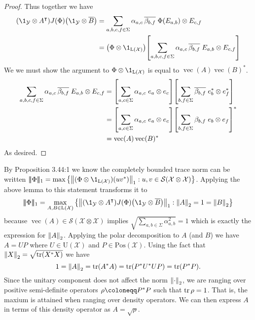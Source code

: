 \documentclass[boxes,pages,color=SeaGreen]{homework}
\renewcommand{\vec}{\operatorname{vec}}
\newcommand{\X}{\mathcal{X}}
\newcommand{\Y}{\mathcal{Y}}
\newcommand{\Lin}{\mathrm{L}}
\newcommand{\Pos}{\mathrm{Pos}}
\newcommand{\Unitary}{\mathrm{U}}
\newcommand{\triplenorm}[1]{
  \lvert\!\lvert\!\lvert #1 
  \rvert\!\rvert\!\rvert}
\begin{document}
\begin{solution}
\begin{proof}
        Thus together we have
        \begin{align*}
            \qty(\1_\Y\otimes A^\intercal)J(\Phi)\qty(\1_\Y\otimes\overline{B}) & = \sum_{a,b,c,f\in\Sigma}\alpha_{a,c}\,\overline{\beta_{b,f}}\;\Phi(E_{a,b})\otimes E_{c,f}                               \\
                                                                                & = \qty(\Phi\otimes\1_{\Lin(\X)})\qty[\sum_{a,b,c,f\in\Sigma}\alpha_{a,c}\,\overline{\beta_{b,f}}\;E_{a,b}\otimes E_{c,f}]
        \end{align*}
        We we must show the argument to $\Phi\otimes\1_{\Lin(\X)}$ is equal to $\vec(A)\vec(B)^*$.
        \begin{align*}
            \sum_{a,b,c,f\in\Sigma}\alpha_{a,c}\,\overline{\beta_{b,f}}\;E_{a,b}\otimes E_{c,f} & = \qty[\sum_{a,c\in\Sigma}\alpha_{a,c}\;e_a\otimes e_c]\qty[\sum_{b,f\in\Sigma}\overline{\beta_{b,f}}\;e_b^*\otimes e_f^*] \\
                                                                                                & = \qty[\sum_{a,c\in\Sigma}\alpha_{a,c}\;e_a\otimes e_c]\qty[\sum_{b,f\in\Sigma}\beta_{b,f}\;e_b\otimes e_f]^*              \\
                                                                                                & = \vec(A)\vec(B)^*
        \end{align*}
        As desired.
    \end{proof}
    By Proposition 3.44:1 we know the completely bounded trace norm can be written $\triplenorm{\Phi}_1 = \max\qty{\norm{(\Phi\otimes\1_{\Lin(\X)})(uv^*)}_1: u,v\in\mathcal{S}(\X\otimes\X)}$.
    Applying the above lemma to this statement transforms it to
    \begin{equation*}
        \triplenorm{\Phi}_1 = \max_{A,B\in\Lin(\X)}\qty{\norm{\qty(\1_\Y\otimes A^\intercal)J(\Phi)\qty(\1_\Y\otimes\overline{B})}_1 : \norm{A}_2 = 1 = \norm{B}_2}
    \end{equation*}
    because $\vec(A)\in\mathcal{S}(\X\otimes\X)$ implies $\sqrt{\sum_{a,b\in\Sigma}\alpha_{a,b}^2} = 1$ which is exactly the expression for $\norm{A}_2$.
    Applying the polar decomposition to $A$ (and $B$) we have $A = UP$ where $U\in\Unitary(\X)$ and $P\in\Pos(\X)$.
    Using the fact that $\norm{X}_2 = \sqrt{\tr(X^*X)}$ we have
    \begin{equation*}
        1 = \norm{A}_2 = \tr(A^*A) = \tr(P^*U^*UP) = \tr(P^*P).
    \end{equation*}
    Since the unitary component does not affect the norm $\norm{\cdot}_2$, we are ranging over positive semi-definite operators $\rho \defeq P^*P$ such that $\tr \rho = 1$.
    That is, the maxium is attained when ranging over density operators.
    We can then express $A$ in terms of this density operator as $A = \sqrt{\rho}$.


\end{solution}
\end{document}

